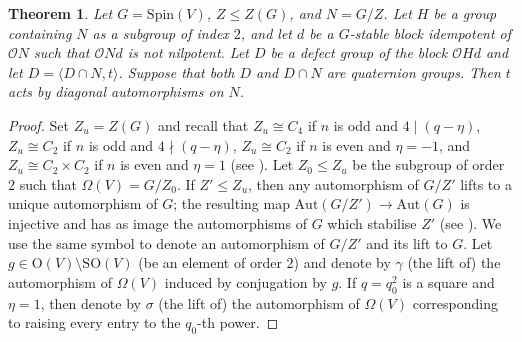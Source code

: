 \documentclass{amsart}
\theoremstyle{plain}\newtheorem{Theorem}{Theorem}[section]
\theoremstyle{plain}\newtheorem{Conjecture}[Theorem]{Conjecture}
\theoremstyle{plain}\newtheorem{Corollary}[Theorem]{Corollary}
\theoremstyle{plain}\newtheorem{Lemma}[Theorem]{Lemma}
\theoremstyle{plain}\newtheorem{Proposition}[Theorem]{Proposition}
\theoremstyle{definition}\newtheorem{Definition}[Theorem]{Definition}
\theoremstyle{definition}\newtheorem{Example}[Theorem]{Example}
\theoremstyle{definition}\newtheorem{Examples}[Theorem]{Examples}
\theoremstyle{definition}\newtheorem{Exercise}[Theorem]{Exercise}
\theoremstyle{definition}\newtheorem{Notation}[Theorem]{Notation}
\theoremstyle{definition}\newtheorem{Remark}[Theorem]{Remark}
\theoremstyle{definition}\newtheorem{Remarks}[Theorem]{Remarks}
\def\CO{{\mathcal{O}}}    \def\OPE{{\mathcal{O}(P\rtimes E)}}
\def\Aut{\mathrm{Aut}}               \def\tenk{\otimes_k}
\def \O{\mathrm{O}}
\def\SO{\mathrm{SO}}
\def\Spin{\mathrm{Spin}}
\numberwithin{equation}{section}
\begin{document}
 \begin{Theorem}   Let  $G= \Spin (V)$,  $Z \leq  Z(G) $, and  $ N =  G/Z$. Let $H$ be  a group containing $ N$ as a subgroup of index $2$, and let $d$ be a $G$-stable  block idempotent of $\CO  N $  such that $\CO  N d$ is not nilpotent. Let $D$  be  a defect group of  the block $\CO Hd $ and   let  $D=\langle  D\cap  N, t\rangle $. 
Suppose that   both $D$ and $D\cap  N$  are quaternion groups.    Then $t$ acts by diagonal automorphisms on $ N$. 
\end{Theorem}


\begin{proof}   Set  $Z_u =  Z(G)$  and  recall that   $Z_u \cong C_4 $ if  $n$ is odd and $4\mid  (q -\eta)$,
 $Z_u \cong C_2$ if  $n$ is odd and $4\nmid  (q -\eta)$, $Z_u  \cong  C_2 $ if  $n $ is even  and $\eta =-1$,  and 
 $Z_u \cong  C_2  \times C_2 $ if  $n $ is even  and $\eta =1$  (see \cite[Thm.~2.5.12]{GLS3}). Let $Z_0 \leq Z_u $ be  the  subgroup of  order $2$  such  that $ \Omega (V)  =  G/Z_0$.   If  $Z' \leq Z_u$, then 
 any  automorphism  of  $G/Z'$ lifts   to a unique automorphism  of $G$;  the  resulting map $\Aut(G/Z') \to \Aut (G) $   is  injective and has as image the automorphisms of  $G$  which  stabilise $Z'$  (see  \cite[Thm.~2.5.14]{GLS3}). We  use the same symbol to denote  an automorphism of  $G/Z'$  and  its  lift to $G$. 
 Let $g \in \O(V)\setminus  \SO(V) $  (be an element of order $2$) and denote by $\gamma $ (the lift of)  the automorphism of $\Omega (V)$  induced  by  conjugation  by  $g$.  If $q=q_0^2$  is a  square and $\eta=1 $, then denote by $\sigma $  (the lift of) the  automorphism  of $\Omega (V) $ corresponding  to  raising every entry to the $q_0$-th power. 


\end{proof}
\end{document}

